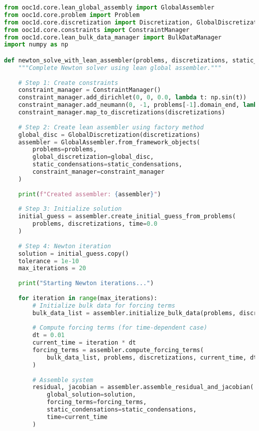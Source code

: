 \begin{lstlisting}[language=Python, caption=Complete Newton Solver Integration]
from ooc1d.core.lean_global_assembly import GlobalAssembler
from ooc1d.core.problem import Problem
from ooc1d.core.discretization import Discretization, GlobalDiscretization
from ooc1d.core.constraints import ConstraintManager
from ooc1d.core.lean_bulk_data_manager import BulkDataManager
import numpy as np

def newton_solve_with_lean_assembler(problems, discretizations, static_condensations):
    """Complete Newton solver using lean global assembler."""
    
    # Step 1: Create constraints
    constraint_manager = ConstraintManager()
    constraint_manager.add_dirichlet(0, 0, 0.0, lambda t: np.sin(t))
    constraint_manager.add_neumann(0, -1, problems[-1].domain_end, lambda t: 0.0)
    constraint_manager.map_to_discretizations(discretizations)
    
    # Step 2: Create lean assembler using factory method
    global_disc = GlobalDiscretization(discretizations)
    assembler = GlobalAssembler.from_framework_objects(
        problems=problems,
        global_discretization=global_disc,
        static_condensations=static_condensations,
        constraint_manager=constraint_manager
    )
    
    print(f"Created assembler: {assembler}")
    
    # Step 3: Initialize solution
    initial_guess = assembler.create_initial_guess_from_problems(
        problems, discretizations, time=0.0
    )
    
    # Step 4: Newton iteration
    solution = initial_guess.copy()
    tolerance = 1e-10
    max_iterations = 20
    
    print("Starting Newton iterations...")
    
    for iteration in range(max_iterations):
        # Initialize bulk data for forcing terms
        bulk_data_list = assembler.initialize_bulk_data(problems, discretizations, time=0.0)
        
        # Compute forcing terms (for time-dependent case)
        dt = 0.01
        current_time = iteration * dt
        forcing_terms = assembler.compute_forcing_terms(
            bulk_data_list, problems, discretizations, current_time, dt
        )
        
        # Assemble system
        residual, jacobian = assembler.assemble_residual_and_jacobian(
            global_solution=solution,
            forcing_terms=forcing_terms,
            static_condensations=static_condensations,
            time=current_time
        )
        

\end{lstlisting}

